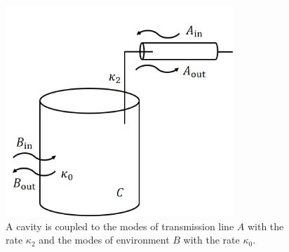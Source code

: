 \begin{figure}[htbp]
    \centering
    \includegraphics[width=8.6cm]{figures/cavity_in_out.jpg}
    \caption{A cavity is coupled to the modes of transmission line $A$ with the 
rate $\kappa_2$ and the modes of environment $B$ with the rate $\kappa_0$.}
    \label{fig:cavity_in_out.jpg}
\end{figure}


